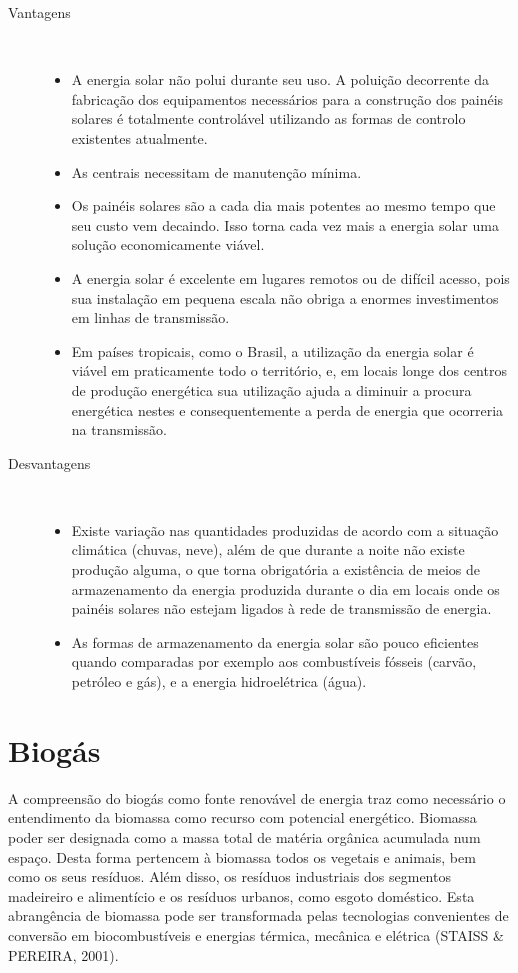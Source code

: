 \begin{description}
	\item [Vantagens] \

	\begin{itemize}
		\item A energia solar não polui durante seu uso. A poluição decorrente da fabricação dos equipamentos necessários para a construção dos painéis solares é totalmente controlável utilizando as formas de controlo existentes atualmente.
		\item As centrais necessitam de manutenção mínima.
		\item Os painéis solares são a cada dia mais potentes ao mesmo tempo que seu custo vem decaindo. Isso torna cada vez mais a energia solar uma solução economicamente viável.
		\item A energia solar é excelente em lugares remotos ou de difícil acesso, pois sua instalação em pequena escala não obriga a enormes investimentos em linhas de transmissão.
		\item Em países tropicais, como o Brasil, a utilização da energia solar é viável em praticamente todo o território, e, em locais longe dos centros de produção energética sua utilização ajuda a diminuir a procura energética nestes e consequentemente a perda de energia que ocorreria na transmissão.
	\end{itemize}

	\item [Desvantagens] \

	\begin{itemize}
		\item Existe variação nas quantidades produzidas de acordo com a situação climática (chuvas, neve), além de que durante a noite não existe produção alguma, o que torna obrigatória a existência de meios de armazenamento da energia produzida durante o dia em locais onde os painéis solares não estejam ligados à rede de transmissão de energia.
		\item As formas de armazenamento da energia solar são pouco eficientes quando comparadas por exemplo aos combustíveis fósseis (carvão, petróleo e gás), e a energia hidroelétrica (água).
	\end{itemize}
\end{description}

\section{Biogás}
A compreensão do biogás como fonte renovável de energia traz como necessário o entendimento da biomassa como recurso com potencial energético. Biomassa poder ser designada como a massa total de matéria orgânica acumulada num espaço. Desta forma pertencem à biomassa todos os vegetais e animais, bem como os seus resíduos. Além disso, os resíduos industriais dos segmentos madeireiro e alimentício e os resíduos urbanos, como esgoto doméstico. Esta abrangência de biomassa pode ser transformada pelas tecnologias convenientes de conversão em biocombustíveis e energias térmica, mecânica e elétrica (STAISS \& PEREIRA, 2001).

